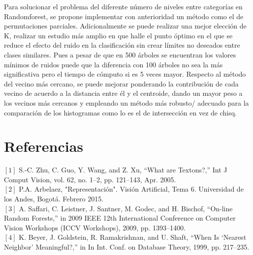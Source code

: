 \documentclass[10pt,twocolumn,letterpaper]{article}
\begin{document}
Para  solucionar el problema del diferente número de niveles entre categorías en Randomforest,  se propone implementar con anterioridad un método como el de permutaciones parciales. Adicionalmente se puede realizar una mejor elección de K, realizar un estudio más amplio en que halle el punto óptimo en el que se reduce el efecto del ruido en la clasificación sin crear límites no deseados entre clases similares. Pues a pesar de que en  500 árboles se encuentran los valores mínimos de ruidos puede que la diferencia con 100 árboles no sea la más significativa pero el tiempo de cómputo si es 5 veces mayor.
Respecto al método del vecino más cercano, se puede mejorar ponderando la contribución de cada vecino de acuerdo a la distancia entre él y el centroide, dando un mayor peso a los vecinos más cercanos y empleando un método más robusto/ adecuado para la comparación de los histogramas como lo es el de intersección en vez de chisq.

\vspace{7 cm}

\section{Referencias}

$[1]$
S.-C. Zhu, C. Guo, Y. Wang, and Z. Xu, “What are Textons?,” Int J Comput Vision, vol. 62, no. 1–2, pp. 121–143, Apr. 2005.\\

\vspace{0.15 cm}
$[2]$
P.A. Arbelaez, "Representación". Visión Artificial, Tema 6. Universidad de los Andes, Bogotá. Febrero 2015.\\

\vspace{0.15 cm}
$[3]$
A. Saffari, C. Leistner, J. Santner, M. Godec, and H. Bischof, “On-line Random Forests,” in 2009 IEEE 12th International Conference on Computer Vision Workshops (ICCV Workshops), 2009, pp. 1393–1400.\\

\vspace{0.15 cm}
$[4]$
K. Beyer, J. Goldstein, R. Ramakrishnan, and U. Shaft, “When Is ‘Nearest Neighbor’ Meaningful?,” in In Int. Conf. on Database Theory, 1999, pp. 217–235.\\
\end{document}
